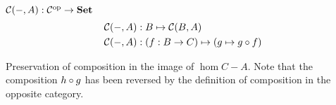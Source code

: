 \begin{definition}\label{def:contra-hom}
  $\mathcal{C}(-, A) : \mathcal{C}^{\text{op}} \to \mathbf{Set}$
  \begin{align*}
    \mathcal{C}(-, A) & : B \mapsto \mathcal{C}(B, A)\\
    \mathcal{C}(-, A) & : (f : B \to C) \mapsto (g \mapsto g \circ f)
  \end{align*}
\end{definition}

\begin{marginfigure}[6em]
  \caption{Preservation of composition in the image of $\hom{C}{-}{A}$. Note that the composition $h\circ g$ has been reversed by the definition of composition in the opposite category.}\label{fig:contra-functor}
\end{marginfigure}


